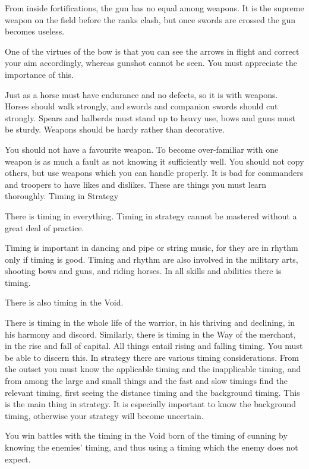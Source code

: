 From inside fortifications, the gun has no equal among weapons. It is the supreme weapon on the field before the ranks clash, but once swords are crossed the gun becomes useless.

One of the virtues of the bow is that you can see the arrows in flight and correct your aim accordingly, whereas gunshot cannot be seen. You must appreciate the importance of this.

Just as a horse must have endurance and no defects, so it is with weapons. Horses should walk strongly, and swords and companion swords should cut strongly. Spears and halberds must stand up to heavy use, bows and guns must be sturdy. Weapons should be hardy rather than decorative.

You should not have a favourite weapon. To become over-familiar with one weapon is as much a fault as not knowing it sufficiently well. You should not copy others, but use weapons which you can handle properly. It is bad for commanders and troopers to have likes and dislikes. These are things you must learn thoroughly.
Timing in Strategy

There is timing in everything. Timing in strategy cannot be mastered without a great deal of practice.

Timing is important in dancing and pipe or string music, for they are in rhythm only if timing is good. Timing and rhythm are also involved in the military arts, shooting bows and guns, and riding horses. In all skills and abilities there is timing.

There is also timing in the Void.

There is timing in the whole life of the warrior, in his thriving and declining, in his harmony and discord. Similarly, there is timing in the Way of the merchant, in the rise and fall of capital. All things entail rising and falling timing. You must be able to discern this. In strategy there are various timing considerations. From the outset you must know the applicable timing and the inapplicable timing, and from among the large and small things and the fast and slow timings find the relevant timing, first seeing the distance timing and the background timing. This is the main thing in strategy. It is especially important to know the background timing, otherwise your strategy will become uncertain.

You win battles with the timing in the Void born of the timing of cunning by knowing the enemies' timing, and thus using a timing which the enemy does not expect.

